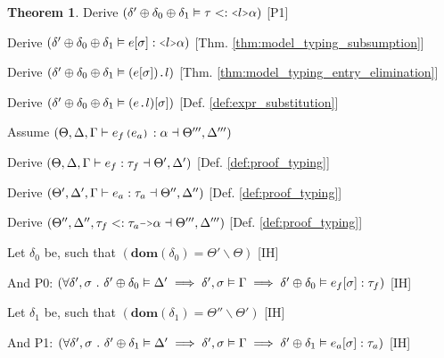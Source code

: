 \documentclass[acmsmall]{acmart}
\theoremstyle{definition}
\newtheorem{theorem}{Theorem}[section]
\begin{document}
\begin{theorem}
  \item \I\I \N Derive $(
    \delta' \oplus \delta_0 \oplus \delta_1 \satisfies \tau \subtypes \J{<} l \J{>} \alpha
  )$ [P1]

  \item \I\I \N Derive $(
    \delta' \oplus \delta_0 \oplus \delta_1 \satisfies e[\sigma] \hastype \J{<}l\J{>}\alpha
  )$ [Thm. \ref{thm:model_typing_subsumption}]

  \item \I\I \N Derive $(
    \delta' \oplus \delta_0 \oplus \delta_1 \satisfies (e[\sigma])\J{.}l
  )$ [Thm. \ref{thm:model_typing_entry_elimination}]

  \item \I\I \N Derive $(
    \delta' \oplus \delta_0 \oplus \delta_1 \satisfies (e\J{.}l)[\sigma]
  )$ [Def. \ref{def:expr_substitution}]

  \item \N Assume $(
    \Theta, \Delta, \Gamma \entails e_f \J{(} e_a \J{)} \hastype \alpha \given \Theta''', \Delta'''
  )$
  \item \I \N Derive $(
    \Theta, \Delta, \Gamma \vdash e_f : \tau_f \dashv \Theta', \Delta'
  )$ [Def. \ref{def:proof_typing}]
  \item \I \N Derive $(
    \Theta', \Delta', \Gamma \vdash e_a : \tau_a \dashv \Theta'', \Delta''
  )$ [Def. \ref{def:proof_typing}]
  \item \I \N Derive $(
    \Theta'', \Delta'', \tau_f \subtypes \tau_a\J{->}\alpha \given \Theta''', \Delta'''
  )$ [Def. \ref{def:proof_typing}]

  \item \I \N Let $\delta_0$ be, such that $(
    \textbf{dom}(\delta_0) = \Theta' \backslash \Theta
  )$ [IH]
  \item \I \N And P0: $(
    \forall \delta', \sigma \ .\  
    \delta' \oplus \delta_0 \vDash \Delta' \implies
    \delta', \sigma \vDash \Gamma \implies
    \delta' \oplus \delta_0 \vDash e_f[\sigma] : \tau_f
  )$ [IH]

  \item \I \N Let $\delta_1$ be, such that $(
    \textbf{dom}(\delta_1) = \Theta'' \backslash \Theta'
  )$ [IH]
  \item \I \N And P1: $(
    \forall \delta', \sigma \ .\  
    \delta' \oplus \delta_1 \vDash \Delta' \implies
    \delta', \sigma \vDash \Gamma \implies
    \delta' \oplus \delta_1 \vDash e_a[\sigma] : \tau_a
  )$ [IH]


\end{theorem}
\end{document}
